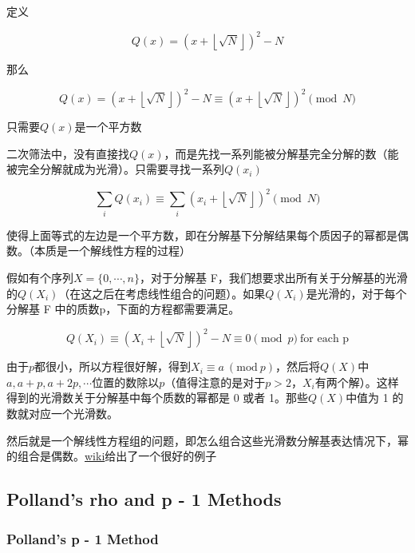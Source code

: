 \documentclass{article}
\begin{document}
定义

\begin{equation}
    Q(x)=(x+\left\lfloor\sqrt{N}\right\rfloor)^2-N
\end{equation}

那么

\begin{equation}
    Q(x) = (x+\left\lfloor\sqrt{N}\right\rfloor)^2-N\equiv (x+\left\lfloor\sqrt{N}\right\rfloor)^2\pmod{N}
\end{equation}

只需要$Q(x)$是一个平方数

二次筛法中，没有直接找$Q(x)$，而是先找一系列能被分解基完全分解的数（能被完全分解就成为光滑）。只需要寻找一系列$Q(x_i)$

\begin{equation}
    \sum_{i}Q(x_i)\equiv \sum_{i}(x_i+\left\lfloor\sqrt{N}\right\rfloor)^2\pmod{N}
\end{equation}

使得上面等式的左边是一个平方数，即在分解基下分解结果每个质因子的幂都是偶数。（本质是一个解线性方程的过程）

假如有个序列$X=\{0,\cdots,n\}$，对于分解基 F，我们想要求出所有关于分解基的光滑的$Q(X_i)$（在这之后在考虑线性组合的问题）。如果$Q(X_i)$是光滑的，对于每个分解基 F 中的质数p，下面的方程都需要满足。

\begin{equation}
    Q(X_i)\equiv (X_i+\left\lfloor\sqrt{N}\right\rfloor)^2-N\equiv 0\pmod{p}~\text{for each p}
\end{equation}

由于$p$都很小，所以方程很好解，得到$X_i\equiv a~(\mathrm{mod}~p)$，然后将$Q(X)$中$a,a+p,a+2p,\cdots$位置的数除以$p$（值得注意的是对于$p>2$，$X_i$有两个解）。这样得到的光滑数关于分解基中每个质数的幂都是 0 或者 1。那些$Q(X)$中值为 1 的数就对应一个光滑数。

然后就是一个解线性方程组的问题，即怎么组合这些光滑数分解基表达情况下，幂的组合是偶数。\href{https://zh.wikipedia.org/wiki/%E4%BA%8C%E6%AC%A1%E7%AF%A9%E9%81%B8%E6%B3%95}{\color{blue}wiki}给出了一个很好的例子 

\subsection{Polland's rho and p - 1 Methods}

\subsubsection{Polland's p - 1 Method}
\end{document}
